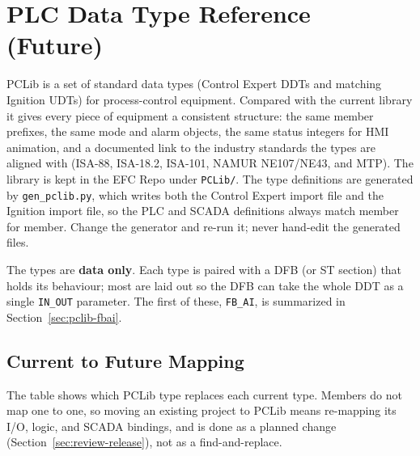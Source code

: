 \chapter{PLC Data Type Reference (Future)}
\label{app:data-types-future}

PCLib is a set of standard data types (Control Expert DDTs and matching Ignition UDTs) for process-control equipment. Compared with the current library it gives every piece of equipment a consistent structure: the same member prefixes, the same mode and alarm objects, the same status integers for HMI animation, and a documented link to the industry standards the types are aligned with (ISA-88, ISA-18.2, ISA-101, NAMUR NE107/NE43, and MTP). The library is kept in the EFC Repo under \texttt{PCLib/}. The type definitions are generated by \texttt{gen\_pclib.py}, which writes both the Control Expert import file and the Ignition import file, so the PLC and SCADA definitions always match member for member. Change the generator and re-run it; never hand-edit the generated files.

The types are \textbf{data only}. Each type is paired with a DFB (or ST section) that holds its behaviour; most are laid out so the DFB can take the whole DDT as a single \texttt{IN\_OUT} parameter. The first of these, \texttt{FB\_AI}, is summarized in Section~\ref{sec:pclib-fbai}.


\section{Current to Future Mapping}
The table shows which PCLib type replaces each current type. Members do not map one to one, so moving an existing project to PCLib means re-mapping its I/O, logic, and SCADA bindings, and is done as a planned change (Section~\ref{sec:review-release}), not as a find-and-replace.



